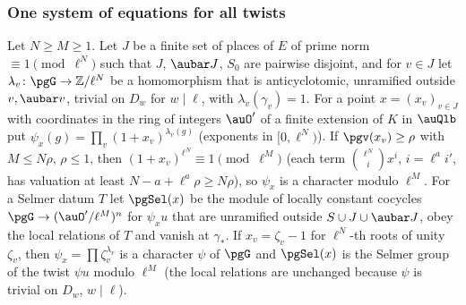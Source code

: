 \documentclass[10pt]{amsart}
\theoremstyle{definition}
\theoremstyle{remark}
\newcommand{\Z}{\mathbb Z}
\begin{document}
\subsubsection*{One system of equations for all twists}
Let $N\ge M\ge1$. Let $J$ be a finite set of places of $E$ of prime norm $\equiv1\pmod{\ell^N}$
such that $J$, $\aubar J$, $S_0$ are pairwise disjoint, and for $v\in J$ let $\lambda_v\colon\pgG
\to\Z/\ell^N$ be a homomorphism that is anticyclotomic, unramified outside $v,\aubar v$, trivial
on $D_w$ for $w\mid\ell$, with $\lambda_v(\gamma_v)=1$. For a point $x=(x_v)_{v\in J}$ with
coordinates in the ring of integers $\auO'$ of a finite extension of $K$ in $\auQlb$ put
$\psi_x(g)=\prod_v(1+x_v)^{\lambda_v(g)}$ (exponents in $[0,\ell^N)$). If $\pgv(x_v)\ge\rho$ with
$M\le N\rho$, $\rho\le1$, then $(1+x_v)^{\ell^N}\equiv1\pmod{\ell^M}$ (each term
$\binom{\ell^N}{i}x^i$, $i=\ell^ai'$, has valuation at least $N-a+\ell^a\rho\ge N\rho$), so
$\psi_x$ is a character modulo $\ell^M$. For a Selmer datum $T$ let $\pgSel(x)$ be the module of
locally constant cocycles $\pgG\to(\auO'/\ell^M)^n$ for $\psi_xu$ that are unramified outside
$S\cup J\cup\aubar J$, obey the local relations of $T$ and vanish at $\gamma_*$. If $x_v=\zeta_v-1$
for $\ell^N$-th roots of unity $\zeta_v$, then $\psi_x=\prod\zeta_v^{\lambda_v}$ is a character
$\psi$ of $\pgG$ and $\pgSel(x)$ is the Selmer group of the twist $\psi u$ modulo $\ell^M$ (the
local relations are unchanged because $\psi$ is trivial on $D_w$, $w\mid\ell$).
\end{document}

